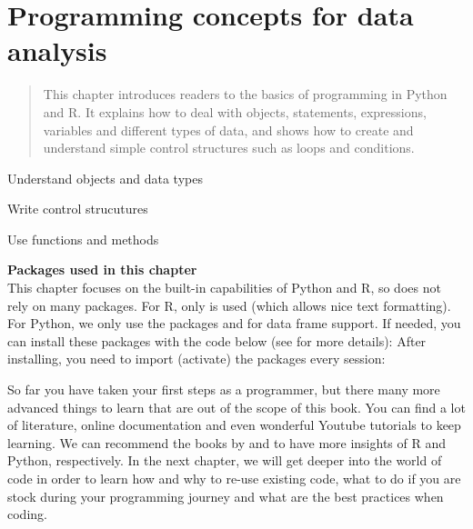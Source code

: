 \chapter{Programming concepts for data analysis}
\label{chap:programmingconcepts}

\begin{abstract}This chapter introduces readers to the basics of programming
  in Python and R. It
explains how to deal with objects, statements, expressions, variables
and different types of data, and shows how to create and understand
simple control structures such as loops and conditions.
\end{abstract}


\begin{objectives}
\item Understand objects and data types
\item Write control strucutures
\item Use functions and methods
\end{objectives}

\newpage
\begin{feature}
  \textbf{Packages used in this chapter}\\
  This chapter focuses on the built-in capabilities of Python and R,
  so does not rely on many packages.
  For R, only  is used (which allows nice text formatting).
  For Python, we only use the packages  and 
  for data frame support.
  If needed, you can install these packages with the code below
  (see  for more details):
  \noindent After installing, you need to import (activate) the packages every session:
\end{feature}








So far you have taken your first steps as a programmer, but there many
more advanced things to learn that are out of the scope of this
book. You can find a lot of literature, online documentation and even
wonderful Youtube tutorials to keep learning. We can recommend the
books by \cite{crawley2012r} and \cite{vanderplas2016python} to have
more insights of R and Python, respectively. In the next chapter, we
will get deeper into the world of code in order to learn how and why
to re-use existing code, what to do if you are stock during your
programming journey and what are the best practices when coding.
